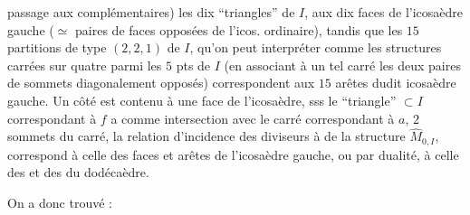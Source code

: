 passage aux complémentaires) les dix ``triangles'' de $I$,  aux dix faces de l'icosaèdre gauche ($\simeq$ paires de faces opposées de l'icos. ordinaire), tandis que les $15$ partitions de type $(2,2,1)$ de $I$, qu'on peut interpréter comme les structures carrées sur quatre parmi les $5$ pts de $I$
(en associant à un tel carré les deux paires de sommets diagonalement opposés) correspondent aux $15$ arêtes dudit icosaèdre gauche.
Un côté  est contenu  à une face  de l'icosaèdre, sss le ``triangle'' $\subset I$ correspondant à $f$ a comme intersection avec le carré correspondant à $a$,   $2$ sommets  du carré, 
 la relation d'incidence des diviseurs à  de la structure $\widehat M_{0,I}$, correspond à celle des faces et arêtes de l'icosaèdre gauche, ou par dualité, à celle des  et des  du dodécaèdre.

On a donc trouvé :

